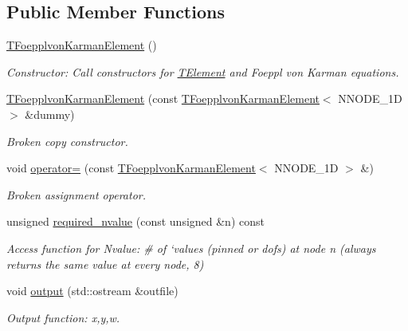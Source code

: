 \subsection*{Public Member Functions}
\begin{DoxyCompactItemize}
\item 
\hyperlink{classoomph_1_1TFoepplvonKarmanElement_a1954fa12bc15c8b8f56b4596eec0696b}{T\+Foepplvon\+Karman\+Element} ()
\begin{DoxyCompactList}\small\item\em Constructor\+: Call constructors for \hyperlink{classoomph_1_1TElement}{T\+Element} and Foeppl von Karman equations. \end{DoxyCompactList}\item 
\hyperlink{classoomph_1_1TFoepplvonKarmanElement_ac2eb4c6e57782f62699e70db1bd876ca}{T\+Foepplvon\+Karman\+Element} (const \hyperlink{classoomph_1_1TFoepplvonKarmanElement}{T\+Foepplvon\+Karman\+Element}$<$ N\+N\+O\+D\+E\+\_\+1D $>$ \&dummy)
\begin{DoxyCompactList}\small\item\em Broken copy constructor. \end{DoxyCompactList}\item 
void \hyperlink{classoomph_1_1TFoepplvonKarmanElement_a3ae70062aaba5d085af4e1bf247cfd4b}{operator=} (const \hyperlink{classoomph_1_1TFoepplvonKarmanElement}{T\+Foepplvon\+Karman\+Element}$<$ N\+N\+O\+D\+E\+\_\+1D $>$ \&)
\begin{DoxyCompactList}\small\item\em Broken assignment operator. \end{DoxyCompactList}\item 
unsigned \hyperlink{classoomph_1_1TFoepplvonKarmanElement_a1d70b5c444369258453eb69e1e86d1e6}{required\+\_\+nvalue} (const unsigned \&n) const
\begin{DoxyCompactList}\small\item\em Access function for Nvalue\+: \# of `values\textquotesingle{} (pinned or dofs) at node n (always returns the same value at every node, 8) \end{DoxyCompactList}\item 
void \hyperlink{classoomph_1_1TFoepplvonKarmanElement_abc6698f8275d8fc4e526b2d7c7fef6de}{output} (std\+::ostream \&outfile)
\begin{DoxyCompactList}\small\item\em Output function\+: x,y,w. \end{DoxyCompactList}\item 

\end{DoxyCompactItemize}
